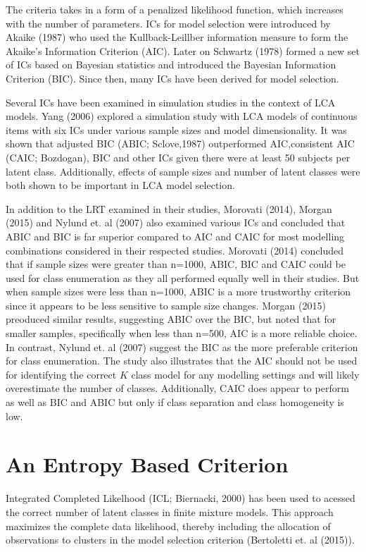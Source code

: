 The criteria takes in a form of a penalized likelihood function, which increases with the number of parameters. ICs for model selection were introduced by Akaike (1987) who used the Kullback-Leillber information measure to form the Akaike's Information Criterion (AIC). Later on Schwartz (1978) formed a new set of ICs based on Bayesian statistics and introduced the Bayesian Information Criterion (BIC). Since then, many ICs have been derived for model selection. 

Several ICs have been examined in simulation studies in the context of LCA models. Yang (2006) explored a simulation study with LCA models of continuous items with six ICs under various sample sizes and model dimensionality. It was shown that adjusted BIC (ABIC; Sclove,1987) outperformed AIC,consistent AIC (CAIC; Bozdogan), BIC and other ICs given there were at least 50 subjects per latent class. Additionally, effects of sample sizes and number of latent classes were both shown to be important in LCA model selection. 

In addition to the LRT examined in their studies, Morovati (2014), Morgan (2015) and Nylund et. al (2007) also examined various ICs and concluded that ABIC and BIC is far superior compared to AIC and CAIC for most modelling combinations considered in their respected studies. Morovati (2014) concluded that if sample sizes were greater than n=1000, ABIC, BIC and CAIC could be used for class enumeration as they all performed equally well in their studies. But when sample sizes were less than n=1000, ABIC is a more trustworthy criterion since it appears to be less sensitive to sample size changes. Morgan (2015) preoduced similar results, suggesting ABIC over the BIC, but noted that for smaller samples, specifically when less than n=500, AIC is a more reliable choice. In contrast, Nylund et. al (2007) suggest the BIC as the more preferable criterion for class enumeration. The study also illustrates that the AIC should not be used for identifying the correct $K$ class model for any modelling settings and will likely overestimate the number of classes. Additionally, CAIC does appear to perform as well as BIC and ABIC but only if class separation and class homogeneity is low. 

\section{An Entropy Based Criterion}
Integrated Completed Likelhood (ICL; Biernacki, 2000) has been used to acessed the correct number of latent classes in finite mixture models. This approach maximizes the complete data likelihood, thereby including the allocation of observations to clusters in the model selection criterion (Bertoletti et. al (2015)). 



